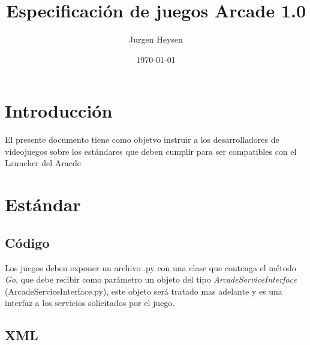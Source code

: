 \documentclass[language=spanish]{article}
\begin{document}
\title{Especificación de juegos Arcade 1.0}
\author{Jurgen Heysen}
\date{\today}
\maketitle
\newpage

\tableofcontents
\newpage

\section{Introducción}
El presente documento tiene como objetvo instruir a los desarrolladores de videojuegos sobre los estándares que deben cumplir para ser compatibles con el Launcher del Aracde

\section{Estándar}

\subsection{Código}

Los juegos deben exponer un archivo .py con una clase que contenga el método {\em Go}, que debe recibir como parámetro un objeto del tipo {\em ArcadeServiceInterface} (ArcadeServiceInterface.py), este objeto será tratado mas adelante y es una interfaz a los servicios solicitados por el juego.

\subsection{XML}
\end{document}
